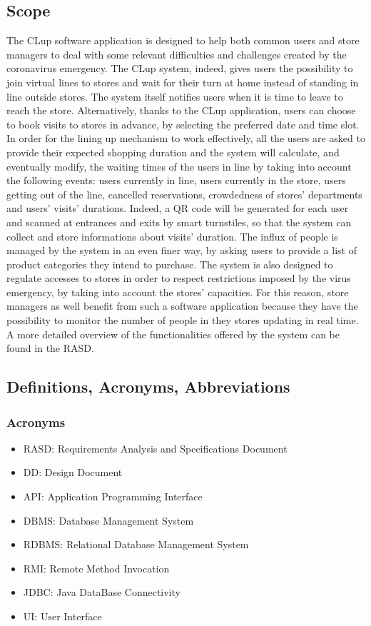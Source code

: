 \documentclass{article}
\begin{document}
\subsection{Scope}
The CLup software application is designed to help both common users and store managers to deal with some relevant difficulties and challenges created by the coronavirus emergency. The CLup system, indeed, gives users the possibility to join virtual lines to stores and wait for their turn at home instead of standing in line outside stores. The system itself notifies users when it is time to leave to reach the store. Alternatively, thanks to the CLup application, users can choose to book visits to stores in advance, by selecting the preferred date and time slot.
 In order for the lining up mechanism to work effectively, all the users are asked to provide their expected shopping duration and the system will calculate, and eventually modify, the waiting times of the users in line by taking into account the following events: users currently in line, users currently in the store, users getting out of the line, cancelled reservations, crowdedness of stores’ departments and users’ visits’ durations. Indeed, a QR code will be generated for each user and scanned at entrances and exits by smart turnstiles, so that the system can collect and store informations about visits’ duration. The influx of people is managed by the system in an even finer way, by asking users to provide a list of product categories they intend to purchase. The system is also designed to regulate accesses to stores in order to respect restrictions imposed by the virus emergency, by taking into account the stores’ capacities. For this reason, store managers as well benefit from such a software application because they have the possibility to monitor the number of people in they stores updating in real time.\\
A more detailed overview of the functionalities offered by the system can be found in the RASD.

\subsection{Definitions, Acronyms, Abbreviations}

\subsubsection{Acronyms}
\begin{itemize}
\item RASD: Requirements Analysis and Specifications Document
\item DD: Design Document
\item API: Application Programming Interface
\item DBMS: Database Management System
\item RDBMS: Relational Database Management System
\item RMI: Remote Method Invocation
\item JDBC: Java DataBase Connectivity
\item UI: User Interface
\end{itemize}
\end{document}
